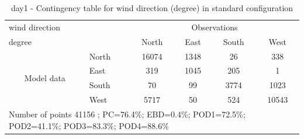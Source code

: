 \begin{table}[p!]
\begin{center}
\begin{tabular}{llcccc}
\hline
{wind direction}                                       &                             &    \multicolumn{4}{c}{Observations}                 \\
{degree}                                       &                             & {North}   & {East} & {South} & {West} \\
\hline
\multicolumn{1}{c}{\multirow{4}{*}{Model data}}  & {North}                    & 16074   & 1348    & 26     & 338\\
                                                 & {East}                     & 319   & 1045    & 205     & 1\\
                                                 & {South}                    & 70   & 99   & 3774    & 1023\\
                                                 & {West}                     & 5717  & 50   & 524    & 10543\\
\hline 
\multicolumn{6}{l}{ Number of points        41156 ; PC=76.4\%; EBD=0.4\%; POD1=72.5\%; POD2=41.1\%; POD3=83.3\%; POD4=88.6\%}                 \\
\end{tabular}
\end{center}
\caption{day1 - Contingency table for {wind direction} (degree) in standard configuration}
\label{tab:contingencywdBEF:day1}
\end{table}
